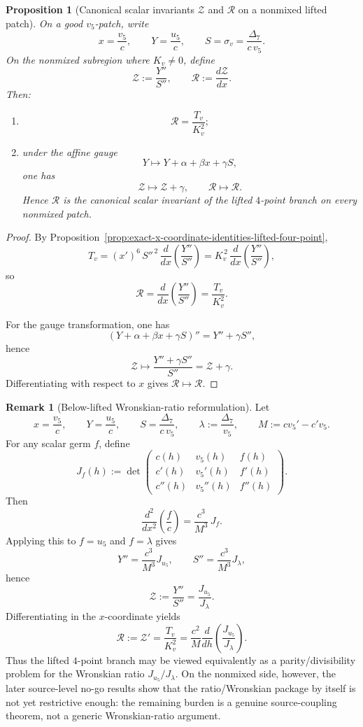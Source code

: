 \documentclass[11pt,a4paper]{amsart}
\theoremstyle{plain}
\newtheorem{proposition}[theorem]{Proposition}
\theoremstyle{definition}
\newtheorem{remark}[theorem]{Remark}
\begin{document}
\begin{proposition}[Canonical scalar invariants $\mathcal Z$ and $\mathcal R$ on a nonmixed lifted patch]
\label{prop:canonical-Z-R-invariants-lifted-four-point}
On a good $v_5$-patch, write
\[
x=\frac{v_5}{c},
\qquad
Y=\frac{u_5}{c},
\qquad
S=\sigma_v=\frac{\Delta_7}{c\,v_5}.
\]
On the nonmixed subregion where $K_v\neq 0$, define
\[
\mathcal Z:=\frac{Y''}{S''},
\qquad
\mathcal R:=\frac{d\mathcal Z}{dx}.
\]
Then:
\begin{enumerate}
\item
\[
\mathcal R=\frac{T_v}{K_v^2};
\]
\item under the affine gauge
\[
Y\longmapsto Y+\alpha+\beta x+\gamma S,
\]
one has
\[
\mathcal Z\longmapsto \mathcal Z+\gamma,
\qquad
\mathcal R\longmapsto \mathcal R.
\]
Hence $\mathcal R$ is the canonical scalar invariant of the lifted
$4$-point branch on every nonmixed patch.
\end{enumerate}
\end{proposition}

\begin{proof}
By Proposition~\ref{prop:exact-x-coordinate-identities-lifted-four-point},
\[
T_v=(x')^6\,S''^{\,2}\,\frac{d}{dx}\!\left(\frac{Y''}{S''}\right)
=K_v^{\,2}\,\frac{d}{dx}\!\left(\frac{Y''}{S''}\right),
\]
so
\[
\mathcal R=\frac{d}{dx}\!\left(\frac{Y''}{S''}\right)=\frac{T_v}{K_v^2}.
\]

For the gauge transformation, one has
\[
(Y+\alpha+\beta x+\gamma S)''=Y''+\gamma S'',
\]
hence
\[
\mathcal Z\longmapsto \frac{Y''+\gamma S''}{S''}=\mathcal Z+\gamma.
\]
Differentiating with respect to $x$ gives $\mathcal R\mapsto \mathcal R$.
\end{proof}

\begin{remark}[Below-lifted Wronskian-ratio reformulation]
\label{rem:below-lifted-wronskian-ratio-reformulation}
Let
\[
x=\frac{v_5}{c},
\qquad
Y=\frac{u_5}{c},
\qquad
S=\frac{\Delta_7}{c\,v_5},
\qquad
\lambda:=\frac{\Delta_7}{v_5},
\qquad
M:=cv_5'-c'v_5.
\]
For any scalar germ $f$, define
\[
J_f(h):=
\det\!\begin{pmatrix}
c(h)&v_5(h)&f(h)\\
c'(h)&v_5'(h)&f'(h)\\
c''(h)&v_5''(h)&f''(h)
\end{pmatrix}.
\]
Then
\[
\frac{d^2}{dx^2}\!\left(\frac{f}{c}\right)
=
\frac{c^3}{M^3}\,J_f.
\]
Applying this to $f=u_5$ and $f=\lambda$ gives
\[
Y''=\frac{c^3}{M^3}J_{u_5},
\qquad
S''=\frac{c^3}{M^3}J_{\lambda},
\]
hence
\[
\boxed{
\mathcal Z:=\frac{Y''}{S''}=\frac{J_{u_5}}{J_{\lambda}}.
}
\]
Differentiating in the $x$-coordinate yields
\[
\boxed{
\mathcal R:=\mathcal Z'=\frac{T_v}{K_v^2}
=
\frac{c^2}{M}\frac{d}{dh}\!\left(\frac{J_{u_5}}{J_{\lambda}}\right).
}
\]
Thus the lifted $4$-point branch may be viewed equivalently as a
parity/divisibility problem for the Wronskian ratio $J_{u_5}/J_\lambda$.
On the nonmixed side, however, the later source-level no-go results show that
the ratio/Wronskian package by itself is not yet restrictive enough: the
remaining burden is a genuine source-coupling theorem, not a generic
Wronskian-ratio argument.
\end{remark}
\end{document}
